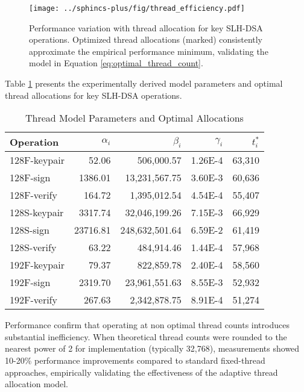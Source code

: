 \documentclass[journal]{IEEEtran}
\begin{document}
\begin{figure}[htbp]
  \centering
  \texttt{[image: ../sphincs-plus/fig/thread\_efficiency.pdf]}
  \caption{Performance variation with thread allocation for key SLH-DSA operations. Optimized thread allocations (marked) consistently approximate the empirical performance minimum, validating the model in Equation \ref{eq:optimal_thread_count}.}
  \label{fig:thread_efficiency}
\end{figure}

Table \ref{tab:thread_model_params} presents the experimentally derived model parameters and optimal thread allocations for key SLH-DSA operations.

\begin{table}[h]
  \centering
  \caption{Thread Model Parameters and Optimal Allocations}
  \label{tab:thread_model_params}
  \begin{tabular}{@{}lrrrr@{}}
    \toprule
    \textbf{Operation} & \boldmath$\alpha_i$ & \boldmath$\beta_i$ & \boldmath$\gamma_i$ & \boldmath$t_i^*$ \\
    \midrule
    128F-keypair & 52.06 & 506,000.57 & 1.26E-4 & 63,310 \\
    128F-sign & 1386.01 & 13,231,567.75 & 3.60E-3 & 60,636 \\
    128F-verify & 164.72 & 1,395,012.54 & 4.54E-4 & 55,407 \\
    128S-keypair & 3317.74 & 32,046,199.26 & 7.15E-3 & 66,929 \\
    128S-sign & 23716.81 & 248,632,501.64 & 6.59E-2 & 61,419 \\
    128S-verify & 63.22 & 484,914.46 & 1.44E-4 & 57,968 \\
    192F-keypair & 79.37 & 822,859.78 & 2.40E-4 & 58,560 \\
    192F-sign & 2319.70 & 23,961,551.63 & 8.55E-3 & 52,932 \\
    192F-verify & 267.63 & 2,342,878.75 & 8.91E-4 & 51,274 \\
    \bottomrule
  \end{tabular}
\end{table}

Performance confirm that operating at non optimal thread counts introduces substantial inefficiency.
When theoretical thread counts were rounded to the nearest power of 2 for implementation (typically 32,768), measurements showed 10-20\% performance improvements compared to standard fixed-thread approaches, empirically validating the effectiveness of the adaptive thread allocation model.
\end{document}

